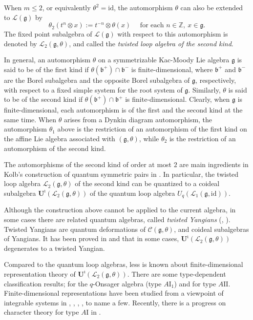 \documentclass[12pt,a4paper]{amsart}
\theoremstyle{definition}
\numberwithin{equation}{subsection}
\begin{document}
When $m \leq 2$, or equivalently $\theta^2 = \mathrm{id}$, the automorphism $\theta$ can also be extended to $\mathcal{L}(\mathfrak{g})$ by
\[
  \theta_2(t^n \otimes x) := t^{-n} \otimes \theta(x) \quad \text{ for each } n \in \mathbb{Z},\ x \in \mathfrak{g}.
\]
The fixed point subalgebra of $\mathcal{L}(\mathfrak{g})$ with respect to this automorphism is denoted by $\mathcal{L}_2(\mathfrak{g},\theta)$, and called the \emph{twisted loop algebra of the second kind}.

In general, an automorphism $\theta$ on a symmetrizable Kac-Moody Lie algebra $\mathfrak{g}$ is said to be of the first kind if $\theta(\mathfrak{b}^+) \cap \mathfrak{b}^-$ is finite-dimensional, where $\mathfrak{b}^+$ and $\mathfrak{b}^-$ are the Borel subalgebra and the opposite Borel subalgebra of $\mathfrak{g}$, respectively, with respect to a fixed simple system for the root system of $\mathfrak{g}$.
Similarly, $\theta$ is said to be of the second kind if $\theta(\mathfrak{b}^+) \cap \mathfrak{b}^+$ is finite-dimensional.
Clearly, when $\mathfrak{g}$ is finite-dimensional, each automorphism is of the first and the second kind at the same time.
When $\theta$ arises from a Dynkin diagram automorphism, the automorphism $\theta_1$ above is the restriction of an automorphism of the first kind on the affine Lie algebra associated with $(\mathfrak{g},\theta)$, while $\theta_2$ is the restriction of an automorphism of the second kind.

The automorphisms of the second kind of order at most $2$ are main ingredients in Kolb's construction of quantum symmetric pairs in \cite{Kol14}.
In particular, the twisted loop algebra $\mathcal{L}_2(\mathfrak{g},\theta)$ of the second kind can be quantized to a coideal subalgebra $\mathbf{U}^\imath(\mathcal{L}_2(\mathfrak{g},\theta))$ of the quantum loop algebra $U_q(\mathcal{L}_1(\mathfrak{g},\mathrm{id}))$.

Although the construction above cannot be applied to the current algebra, in some cases there are related quantum algebras, called \emph{twisted Yangians} (\cite{Ols92}, \cite{GuRe16}).
Twisted Yangians are quantum deformations of $\mathcal{C}(\mathfrak{g},\theta)$, and coideal subalgebras of Yangians.
It has been proved in \cite{CoGu15} and \cite{LWZ24} that in some cases, $\mathbf{U}^\imath(\mathcal{L}_2(\mathfrak{g},\theta))$ degenerates to a twisted Yangian.

Compared to the quantum loop algebras, less is known about finite-dimensional representation theory of $\mathbf{U}^\imath(\mathcal{L}_2(\mathfrak{g},\theta))$.
There are some type-dependent classification results; \cite{ItTe10} for the $q$-Onsager algebra (type $A\mathrm{I}_1$) and \cite{GoMo10} for type $A\mathrm{II}$.
Finite-dimensional representations have been studied from a viewpoint of integrable systems in \cite{KOY19}, \cite{KuOk22}, \cite{ApVl22b}, \cite{KOW22}, to name a few.
Recently, there is a progress on character theory for type $A\mathrm{I}$ in \cite{LiPr25}.
\end{document}
